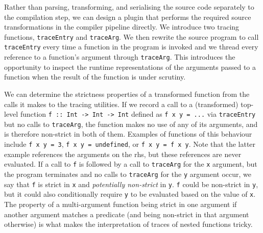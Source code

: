\documentclass[thesis=B,english]{FITthesis}[2019/12/23]
\newcommand{\hsIdent}[1]{\texttt{#1}}
\newcommand{\hsCode}[1]{\texttt{#1}}
\begin{document}
Rather than parsing, transforming, and serialising the source code separately
to the compilation step, we can design a plugin that performs the required
source transformations in the compiler pipeline directly. We introduce two
tracing functions, \hsIdent{traceEntry} and \hsIdent{traceArg}. We then rewrite
the source program to call \hsIdent{traceEntry} every time a function in the
program is invoked and we thread every reference to a function's argument
through \hsIdent{traceArg}. This introduces the opportunity to inspect the
runtime representations of the arguments passed to a function when the result
of the function is under scrutiny.

We can determine the strictness properties of a transformed function from the
calls it makes to the tracing utilities. If we record a call to a (transformed)
top-level function \hsCode{f :: Int -> Int -> Int} defined as \hsCode{f x y =
...} via \hsIdent{traceEntry} but no calls to \hsIdent{traceArg}, the
function makes no use of any of its arguments, and is therefore non-strict in
both of them. Examples of functions of this behaviour include \hsCode{f x y =
3}, \hsCode{f x y = undefined}, or \hsCode{f x y = f x y}. Note that the latter
example references the arguments on the \acrshort{rhs}, but these references are
never evaluated. If a call to \hsIdent{f} is followed by a call to
\hsIdent{traceArg} for the \hsIdent{x} argument, but the program terminates and
no calls to \hsIdent{traceArg} for the \hsIdent{y} argument occur, we say that
\hsIdent{f} is strict in \hsIdent{x} and \textit{potentially non-strict} in
\hsIdent{y}. \hsIdent{f} could be non-strict in \hsIdent{y}, but it could also
conditionally require \hsIdent{y} to be evaluated based on the value of
\hsIdent{x}. The property of a multi-argument function being strict in one
argument if another argument matches a predicate (and being non-strict in that
argument otherwise) is what makes the interpretation of traces of nested
functions tricky.
\end{document}
